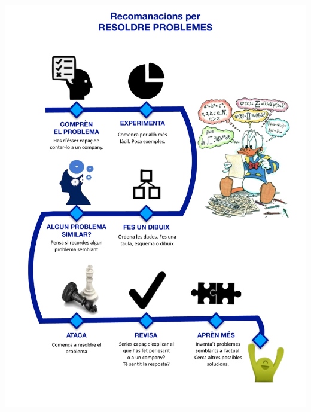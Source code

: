 \dominitoc

\tableofcontents

\newpage

\vspace*{\fill}
\begin{center}
	\includegraphics[width=\textwidth]{img-00/resolucio-problemes}
\end{center}
\vspace*{\fill}



\cleartorightpage


\vspace*{2cm} 

